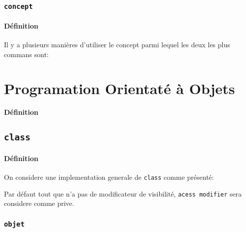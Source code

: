 \documentclass{article}
\begin{document}

\subsubsection{\texttt{concept}}
\paragraph{Définition}Il y a plusieurs manières d'utiliser le concept parmi lequel les deux les plus commans sont:
\begin{scriptsize}
    \mycode
\end{scriptsize}


\section{Programation Orientaté à Objets}
\paragraph{Définition}

\subsection{\texttt{class}}
\paragraph{Définition}On considere une implementation generale de \texttt{class} comme présenté:
\begin{scriptsize}
    \mycode
\end{scriptsize}
Par défaut tout que n'a pas de modificateur de visibilité, \texttt{acess modifier} sera considere comme prive.


\subsubsection{\texttt{objet}}
\end{document}
